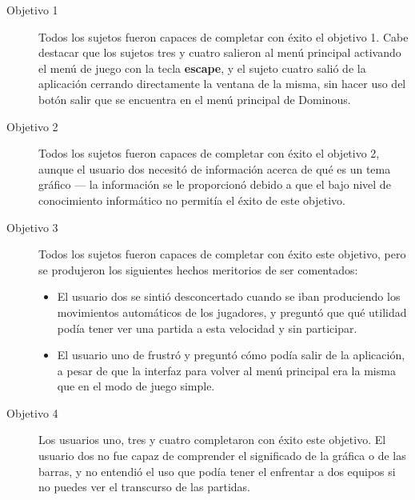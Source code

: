 \begin{description}
    \item[Objetivo 1] Todos los sujetos fueron capaces de completar con éxito el objetivo 1. Cabe destacar que los sujetos
            tres y cuatro salieron al menú principal activando el menú de juego con la tecla \textbf{escape}, y el
            sujeto cuatro salió de la aplicación cerrando directamente la ventana de la misma, sin hacer uso del
            botón salir que se encuentra en el menú principal de Dominous.
    \item[Objetivo 2] Todos los sujetos fueron capaces de completar con éxito el objetivo 2, aunque el usuario dos
            necesitó de información acerca de qué es un tema gráfico --- la información se le proporcionó debido a que el
            bajo nivel de conocimiento informático no permitía el éxito de este objetivo.
    \item[Objetivo 3] Todos los sujetos fueron capaces de completar con éxito este objetivo, pero se produjeron los
            siguientes hechos meritorios de ser comentados:
            \begin{itemize}
                \item El usuario dos se sintió desconcertado cuando se iban produciendo los movimientos automáticos
                    de los jugadores, y preguntó que qué utilidad podía tener ver una partida a esta velocidad y sin
                    participar.
                \item El usuario uno de frustró y preguntó cómo podía salir de la aplicación, a pesar de que la interfaz
                    para volver al menú principal era la misma que en el modo de juego simple.
            \end{itemize}
    \item[Objetivo 4] Los usuarios uno, tres y cuatro completaron con éxito este objetivo. El usuario dos no fue
            capaz de comprender el significado de la gráfica o de las barras, y no entendió el uso que podía tener el
            enfrentar a dos equipos si no puedes ver el transcurso de las partidas.
\end{description}
